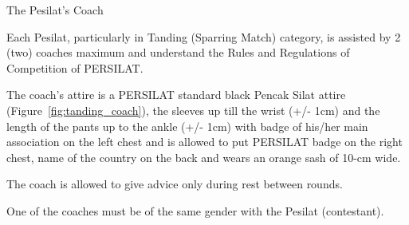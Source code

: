 \begin{legal}
\item The Pesilat’s Coach
    \begin{legal}
    \item Each Pesilat, particularly in Tanding (Sparring Match) category, is assisted by 2 (two) coaches maximum and understand the Rules and Regulations of Competition of PERSILAT.
    \item The coach’s attire is a PERSILAT standard black Pencak Silat attire (Figure~\ref{fig:tanding_coach}), the sleeves up till
the wrist (+/- 1cm) and the length of the pants up to the ankle (+/- 1cm) with badge
of his/her main association on the left chest and is allowed to put PERSILAT badge on
the right chest, name of the country on the back and wears an orange sash of 10-cm wide.
    \item The coach is allowed to give advice only during rest between rounds.
    \item One of the coaches must be of the same gender with the Pesilat (contestant).


\end{legal}
\end{legal}
